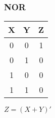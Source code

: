 \documentclass{article}
\begin{document}
\begin{multicols}{2}
\begin{center}
            \subsubsection*{NOR}
            \vspace{1em}
            \begin{tabular}{cc|c}
                X \hspace{1em} & Y \hspace{1em} & \hspace{1em}Z \\
                \hline
                0 \hspace{1em} & 0 \hspace{1em} & \hspace{1em}1 \\
                0 \hspace{1em} & 1 \hspace{1em} & \hspace{1em}0 \\
                1 \hspace{1em} & 0 \hspace{1em} & \hspace{1em}0 \\
                1 \hspace{1em} & 1 \hspace{1em} & \hspace{1em}0 \\
            \end{tabular}

            \vspace{2em}
            $Z=(X+Y)'$

            \vspace{4em}

\end{center}
\end{multicols}
\end{document}
